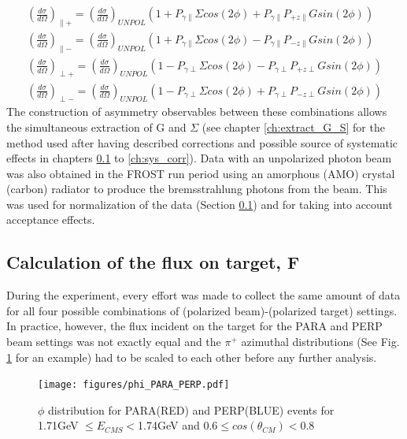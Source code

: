 \begin{eqnarray}
\left(\frac{d\sigma}{d\Omega}\right)_{\parallel +} = \left(\frac{d\sigma}{d\Omega}\right)_{UNPOL}  \left( 1 + P_{\gamma \parallel}\Sigma cos(2\phi) + P_{\gamma \parallel} P_{+z\parallel} G sin(2\phi) \right) \\
\left(\frac{d\sigma}{d\Omega}\right)_{\parallel -} = \left(\frac{d\sigma}{d\Omega}\right)_{UNPOL}  \left( 1 + P_{\gamma \parallel}\Sigma cos(2\phi) - P_{\gamma \parallel} P_{-z\parallel} G sin(2\phi) \right) \\
\left(\frac{d\sigma}{d\Omega}\right)_{\perp +} = \left(\frac{d\sigma}{d\Omega}\right)_{UNPOL}  \left( 1 - P_{\gamma \perp}\Sigma cos(2\phi) - P_{\gamma \perp} P_{+z\perp} G sin(2\phi) \right) \\
\left(\frac{d\sigma}{d\Omega}\right)_{\perp -} = \left(\frac{d\sigma}{d\Omega}\right)_{UNPOL}  \left( 1 - P_{\gamma \perp}\Sigma cos(2\phi) + P_{\gamma \perp} P_{-z\perp} G sin(2\phi) \right)
\end{eqnarray}
The construction of asymmetry observables between these combinations allows the simultaneous extraction of G and $\Sigma$ (see chapter \ref{ch:extract_G_S} for the method used after having described corrections and possible source of systematic effects in chapters \ref{ch:flux} to \ref{ch:sys_corr}). Data with an unpolarized photon beam was also obtained in the FROST run period using an amorphous (AMO) crystal (carbon) radiator to produce the bremsstrahlung photons from the beam. This was used for normalization of the data (Section \ref{ch:flux}) and for taking into account acceptance effects. 

\subsection{Calculation of the flux on target, F} \label{ch:flux}
During the experiment, every effort was made to collect the same amount of data for all four possible combinations of (polarized beam)-(polarized target) settings. In practice, however, the flux incident on the target for the PARA and PERP beam settings was not exactly equal and the $\pi^+$ azimuthal distributions (See Fig. \ref{fig:frost_PARA_ex} for an example) had to be scaled to each other before any further analysis.
\begin{figure}[H]
  \begin{center}
    \texttt{[image: figures/phi\_PARA\_PERP.pdf]} \\
    \caption{$\phi$ distribution for PARA(RED) and PERP(BLUE) events for 1.71GeV $\leq E_{CMS} <$1.74GeV and $0.6 \leq cos(\theta_{CM})< 0.8$ }
    \label{fig:frost_PARA_ex}
  \end{center}
\end{figure}



